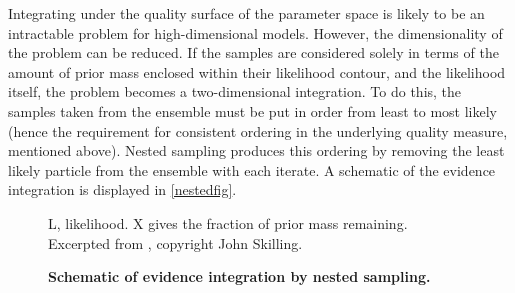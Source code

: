 Integrating under the quality surface of the parameter space is likely to be an intractable problem for high-dimensional models. However, the dimensionality of the problem can be reduced. If the samples are considered solely in terms of the amount of prior mass enclosed within their likelihood contour, and the likelihood itself, the problem becomes a two-dimensional integration. To do this, the samples taken from the ensemble must be put in order from least to most likely (hence the requirement for consistent ordering in the underlying quality measure, mentioned above). Nested sampling produces this ordering by removing the least likely particle from the ensemble with each iterate. A schematic of the evidence integration is displayed in \autoref{nestedfig}.

\begin{figure}[!h]
    \caption{{\bf Schematic of evidence integration by nested sampling.}} L, likelihood. X gives the fraction of prior mass remaining. Excerpted from \cite{Skilling2006}, copyright John Skilling.
    \label{nestedfig}
\end{figure}

